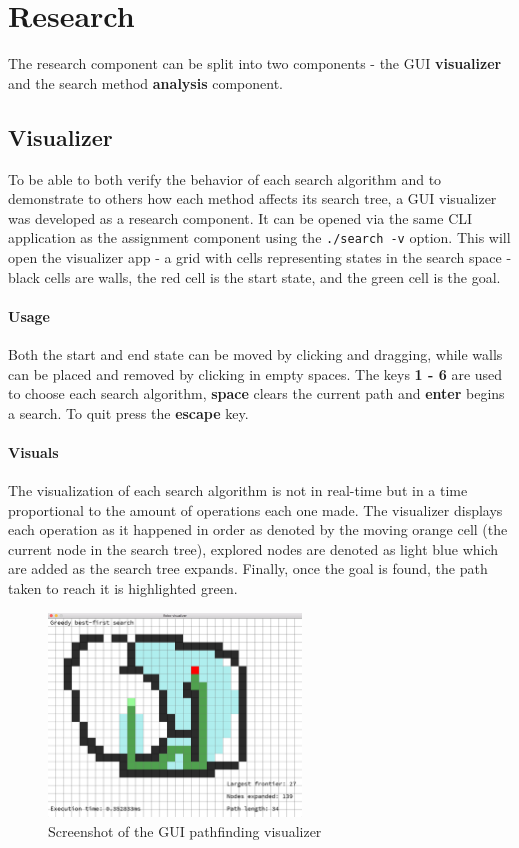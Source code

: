 \section{Research} %
\label{sec:research}
The research component can be split into two components - the GUI \textbf{visualizer} and the search method \textbf{analysis} component.

\subsection{Visualizer} %
\label{sub:visualizer}
To be able to both verify the behavior of each search algorithm and to demonstrate to others how each method affects its search tree, a GUI visualizer was developed as a research component. It can be opened via the same CLI application as the assignment component using the \texttt{./search -v} option. This will open the visualizer app - a grid with cells representing states in the search space - black cells are walls, the red cell is the start state, and the green cell is the goal.

\paragraph{Usage} %
\label{par:usage}
Both the start and end state can be moved by clicking and dragging, while walls can be placed and removed by clicking in empty spaces. The keys \textbf{1 - 6} are used to choose each search algorithm, \textbf{space} clears the current path and \textbf{enter} begins a search. To quit press the \textbf{escape} key.

\paragraph{Visuals} %
\label{par:visuals}
The visualization of each search algorithm is not in real-time but in a time proportional to the amount of operations each one made. The visualizer displays each operation as it happened in order as denoted by the moving orange cell (the current node in the search tree), explored nodes are denoted as light blue which are added as the search tree expands. Finally, once the goal is found, the path taken to reach it is highlighted green.

\begin{figure}[H]
	\centering
	\includegraphics[width=0.6\textwidth]{Resources/vis.png}
	\caption{Screenshot of the GUI pathfinding visualizer}
\end{figure}

